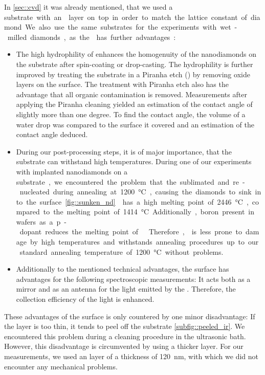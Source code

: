 	In \autoref{sec::cvd} it was already mentioned, that we used a \si substrate with an \ir layer on top in order to match the lattice constant of diamond.
	We also use the same substrates for the experiments with wet-milled diamonds, as the \ir has further advantages:
	\begin{itemize}
		\item The high hydrophility of \ir {} enhances the homogenuity of the nanodiamonds on the substrate after spin-coating or drop-casting. 
		The hydrophility is further improved by treating the substrate in a Piranha etch () by removing oxide layers on the surface. 
		The treatment with Piranha etch also has the advantage that all organic contamination is removed.
		Measurements after applying the Piranha cleaning yielded an estimation of the contact angle of slightly more than one degree.
		To find the contact angle, the volume of a water drop was compared to the surface it covered and an estimation of the contact angle deduced.
		\item During our post-processing steps, it is of major importance, that the substrate can withstand high temperatures.
		During one of our experiments with implanted nanodiamonds on a \si substrate, we encountered the problem that the \si sublimated and re-nucleated during annealing at \SI{1200}{\celsius}, causing the diamonds to sink into the \si surface \ref{fig::sunken_nd}.
		\Ir has a high melting point of \SI{2446}{\celsius}, compared to the melting point of \SI{1414}{\celsius}.
		Additionally, boron present in \si wafers as a p-dopant reduces the melting point of .
		Therefore, \ir is less prone to damage by high temperatures and withstands annealing procedures up to our standard annealing temperature of \SI{1200}{\celsius} without problems.
		\item Additionally to the mentioned technical advantages, the \ir surface has advantages for the following spectroscopic measurements: 
		It acts both as a mirror and as an antenna for the \fl light emitted by the \siv \cite{}.
		Therefore, the collection efficiency of the \fl light is enhanced.
	\end{itemize}
	These advantages of the \ir surface is only countered by one minor disadvantage:
	If the \ir layer is too thin, it tends to peel off the substrate \autoref{subfig::peeled_ir}.
	We encountered this problem during a cleaning procedure in the ultrasonic bath.
	However, this disadvantage is circumvented by using a thicker \ir layer.
	For our measurements, we used an \Ir layer of a thickness of \SI{120}{nm}, with which we did not encounter any mechanical problems.
